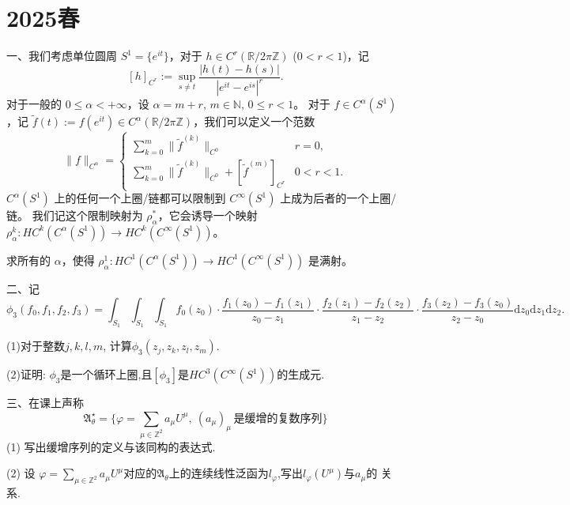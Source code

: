 
\section{2025春}

一、我们考虑单位圆周 \( S^1 = \{e^{it}\} \)，对于 \( h \in C^r(\mathbb{R}/2\pi\mathbb{Z}) \) (\( 0 < r < 1 \))，记
\[
[h]_{C^r} := \sup_{s \neq t} \frac{|h(t) - h(s)|}{|e^{it} - e^{is}|^r}.
\]
对于一般的 \( 0 \leqslant \alpha < +\infty \)，设 \(\alpha = m + r, \, m \in \mathbb{N}, \, 0 \leqslant r < 1 \)。
对于 \( f \in C^\alpha(S^1) \)，记 \(\tilde{f}(t) := f(e^{it}) \in C^\alpha(\mathbb{R}/2\pi\mathbb{Z})\)，我们可以定义一个范数
\[
\|f\|_{C^\alpha} =
\begin{cases}
\displaystyle \sum_{k=0}^m \|\tilde{f}^{(k)}\|_{C^0} & r = 0, \\
\displaystyle \sum_{k=0}^m \|\tilde{f}^{(k)}\|_{C^0} + [\tilde{f}^{(m)}]_{C^r} & 0 < r < 1.
\end{cases}
\]
\( C^\alpha(S^1) \) 上的任何一个上圈/链都可以限制到 \( C^\infty(S^1) \) 上成为后者的一个上圈/链。
我们记这个限制映射为 \( \rho_\alpha^* \)，它会诱导一个映射 \( \rho_\alpha^k : HC^k(C^\alpha(S^1)) \to HC^k(C^\infty(S^1)) \)。

求所有的 \(\alpha\)，使得 \( \rho_\alpha^1 : HC^1(C^\alpha(S^1)) \to HC^1(C^\infty(S^1)) \) 是满射。


二、记$$\phi_3(f_0, f_1, f_2, f_3) = \int_{S_1} \int_{S_1} \int_{S_1} f_0(z_0) \cdot \frac{f_1(z_0) - f_1(z_1)}{z_0-z_1} \cdot \frac{f_2(z_1) - f_2(z_2)}{z_1 - z_2}\cdot \frac{f_3(z_2) - f_3(z_0)}{z_2 - z_0} \mathrm{d}z_0 \mathrm{d} z_1 \mathrm{d} z_2.$$

(1)对于整数$j,k,l,m$, 计算$\phi_3(z_j, z_k, z_l, z_m)$.

(2)证明: $\phi_3$是一个循环上圈,且$[\phi_3]$是$HC^3(C^{\infty}(S^1))$的生成元.

三、在课上声称
$$\mathfrak{A}_{\theta}^{\star} = \{\varphi = \sum_{\mu\in \mathbb{Z}^2} a_{\mu} U^{\mu}, \ (a_{\mu})_{\mu}\,是缓增的复数序列 \}$$
 (1) 写出缓增序列的定义与该同构的表达式.

 (2) 设 $\varphi = \sum_{\mu\in \mathbb{Z}^2} a_{\mu} U^{\mu}$对应的$\mathfrak{A}_{\theta}$上的连续线性泛函为$l_{\varphi}$,写出$l_{\varphi}(U^{\mu})$与$a_{\mu}$的
关系.

